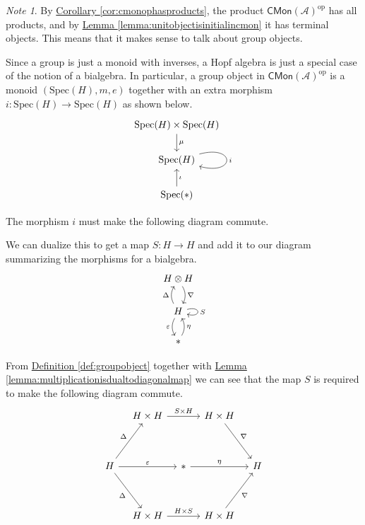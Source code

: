 \documentclass[a4paper,10pt]{scrreprt}
\newcommand{\spec}{\mathrm{Spec}}
\theoremstyle{definition}
\theoremstyle{plain}
\theoremstyle{remark}
\newtheorem{note}{Note}[section]
\begin{document}
\begin{note}
  By \hyperref[cor:cmonophasproducts]{Corollary \ref*{cor:cmonophasproducts}}, the product $\mathsf{CMon}(\mathscr{A})^{\mathrm{op}}$ has all products, and by \hyperref[lemma:unitobjectisinitialincmon]{Lemma \ref*{lemma:unitobjectisinitialincmon}} it has terminal objects. This means that it makes sense to talk about group objects.
\end{note}

Since a group is just a monoid with inverses, a Hopf algebra is just a special case of the notion of a bialgebra. In particular, a group object in $\mathsf{CMon}(\mathscr{A})^{\mathrm{op}}$ is a monoid $(\spec(H), m, e)$ together with an extra morphism $i\colon \spec(H) \to \spec(H)$ as shown below.
\begin{equation*}
  \begin{tikzcd}
    \spec(H) \times \spec(H)
    \arrow[d, "\mu"]
    \\
    \spec(H) 
    \arrow[loop right, "i"]
    \\
    \spec(*)
    \arrow[u, swap, "\iota"]
  \end{tikzcd}
\end{equation*}

The morphism $i$ must make the following diagram commute.

We can dualize this to get a map $S\colon H \to H$ and add it to our diagram summarizing the morphisms for a bialgebra.
\begin{equation*}
  \begin{tikzcd}
    H \otimes H
    \arrow[d, bend left, "\nabla"]
    \\
    H
    \arrow[u, bend left, "\Delta"]
    \arrow[d, swap, bend right, "\varepsilon"]
    \arrow[loop right, "S"]
    \\
    *
    \arrow[u, swap, bend right, "\eta"]
  \end{tikzcd}
\end{equation*}

From \hyperref[def:groupobject]{Definition \ref*{def:groupobject}} together with \hyperref[lemma:multiplicationisdualtodiagonalmap]{Lemma \ref*{lemma:multiplicationisdualtodiagonalmap}} we can see that the map $S$ is required to make the following diagram commute.
\begin{equation*}
  \begin{tikzcd}[row sep=3.6em,column sep=1em]
    & H\times H 
    \arrow[rr,"S\times H"] 
    & & H\times H 
    \arrow[dr,"\nabla"] 
    \\
    H 
    \arrow[ur,"\Delta"] 
    \arrow[rr, "\varepsilon"] 
    \arrow[dr, swap, "\Delta"] 
    & & * 
    \arrow[rr,"\eta"] 
    & & H 
    \\
    & H\times H 
    \arrow[rr," H\times S"] 
    & & H\times H 
    \arrow[ur, swap, "\nabla"]
  \end{tikzcd}
\end{equation*}
\end{document}
